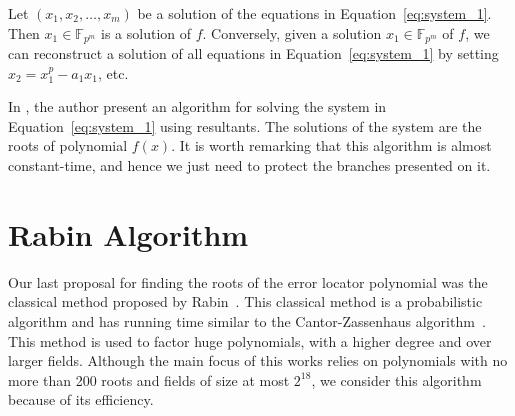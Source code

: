 \begin{theorem}\label{lemma_2}
Let $(x_1,x_2,\ldots,x_m)$ be a solution of the equations in Equation~\ref{eq:system_1}. Then $x_1 \in \mathbb{F}_{p^m}$ is a solution of $f$. Conversely, given a solution $x_1 \in \mathbb{F}_{p^m}$ of $f$, we can reconstruct a solution of all equations in Equation~\ref{eq:system_1} by setting $x_2 =x_1^p - a_1x_1$, etc.
\end{theorem}

In \cite{petit2014finding}, the author present an algorithm for solving the system in Equation~\ref{eq:system_1} using resultants. The solutions of the system are the roots of polynomial $f(x)$. It is worth remarking that this algorithm is almost constant-time, and hence we just need to protect the branches presented on it.





\section{Rabin Algorithm}
Our last proposal for finding the roots of the error locator polynomial was the classical method proposed by Rabin~\cite{rabin1980probabilistic}. This classical method is a probabilistic algorithm and has running time similar to the Cantor-Zassenhaus algorithm~\cite{cantor1981new}. This method is used to factor huge polynomials, with a higher degree and over larger fields. Although the main focus of this works relies on polynomials with no more than 200 roots and fields of size at most $2^{18}$, we consider this algorithm because of its efficiency.

